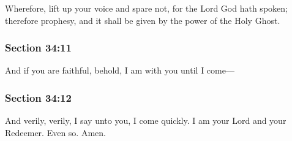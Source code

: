 		Wherefore, lift up your voice and spare not, for the Lord God hath spoken; therefore prophesy, and it shall be given by the power of the Holy Ghost.


	\subsubsection{Section 34:11} %
		\label{DC34-11}

		And if you are faithful, behold, I am with you until I come---


	\subsubsection{Section 34:12} %
		\label{DC34-12}

		And verily, verily, I say unto you, I come quickly. I am your Lord and your Redeemer. Even so. Amen.

